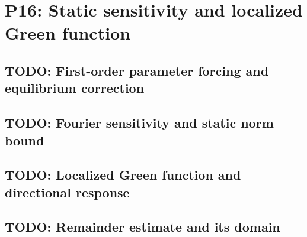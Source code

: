 
\section{P16: Static sensitivity and localized Green function}
\label{sec:P16}

\subsection{TODO: First-order parameter forcing and equilibrium correction}
\label{slot:P16-1}

\subsection{TODO: Fourier sensitivity and static norm bound}
\label{slot:P16-2}

\subsection{TODO: Localized Green function and directional response}
\label{slot:P16-3}

\subsection{TODO: Remainder estimate and its domain}
\label{slot:P16-4}
